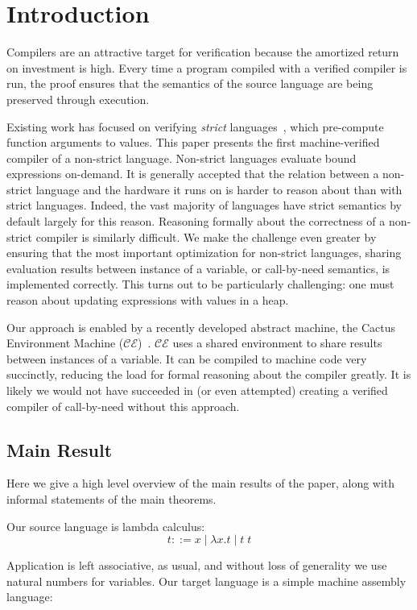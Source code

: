 \section{Introduction}
Compilers are an attractive target for verification because the amortized return
on investment is high. Every time a program compiled with a verified compiler is
run, the proof ensures that the semantics of the source language are being
preserved through execution. 

Existing work has focused on verifying \emph{strict}
languages~\cite{chlipala2007certified, leroy2012compcert}, which pre-compute
function arguments to values. This paper presents the first machine-verified
compiler of a non-strict language. Non-strict languages evaluate bound
expressions on-demand. It is generally accepted that the relation between a
non-strict language and the hardware it runs on is harder to reason about than
with strict languages.  Indeed, the vast majority of languages have strict
semantics by default largely for this reason. Reasoning formally about the
correctness of a non-strict compiler is similarly difficult. We make the
challenge even greater by ensuring that the most important optimization for
non-strict languages, sharing evaluation results between instance of a variable,
or call-by-need semantics, is implemented correctly. This turns out to be
particularly challenging: one must reason about updating expressions with values
in a heap. 

Our approach is enabled by a recently developed abstract machine, the Cactus
Environment Machine ($\mathcal{CE}$)~\cite{?}. $\mathcal{CE}$ uses a shared
environment to share results between instances of a variable. It can be compiled
to machine code very succinctly, reducing the load for formal reasoning about
the compiler greatly. It is likely we would not have succeeded in (or even
attempted) creating a verified compiler of call-by-need without this approach.

\subsection{Main Result}
Here we give a high level overview of the main results of the paper, along with
informal statements of the main theorems.

Our source language is lambda calculus: 
$$ t ::= x \; | \; \lambda x.t \; | \; t \; t $$

Application is left associative, as usual, and without loss of generality we
use natural numbers for variables. Our target language is a simple machine
assembly language:

